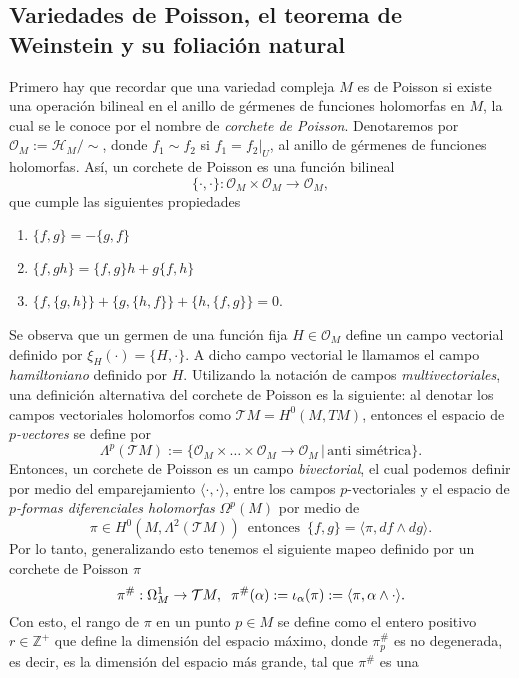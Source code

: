 \documentclass{article}
\newcommand{\zah}{\ensuremath{ \mathbb Z }}
\begin{document}
\subsection{Variedades de Poisson, el teorema de Weinstein y su foliaci\'on natural}
\noindent Primero hay que recordar que una variedad compleja $M$ es de Poisson si existe una operaci\'on bilineal en el anillo de g\'ermenes de 
funciones holomorfas en $M$, la cual se le conoce por el nombre de \emph{corchete de Poisson}. Denotaremos por $\mathcal{O}_M:=\mathcal{H}_M/\sim$, donde $f_1\sim f_2$ si 
$f_1=f_2|_U$, al anillo de g\'ermenes de funciones holomorfas. As\'i, un corchete de Poisson es una funci\'on bilineal
\[
\{\cdot,\cdot\}:\mathcal{O}_M\times\mathcal{O}_M\rightarrow\mathcal{O}_M,
\]
que cumple las siguientes propiedades
\begin{enumerate}
\item $\{f,g\} = -\{g,f\}$
\item $\{f,gh\}=\{f,g\}h + g\{f,h\}$
\item $\{f,\{g,h\}\}+\{g,\{h,f\}\} + \{h,\{ f,g\}\}=0$.
\end{enumerate}
\noindent Se observa que un germen de una funci\'on fija $H\in\mathcal{O}_M$ define un campo vectorial definido por $\xi_H(\cdot)=\{H,\cdot\}$.
A dicho campo vectorial le llamamos el campo \emph{hamiltoniano} definido por $H$. Utilizando la notaci\'on de campos \emph{multivectoriales}, 
una definici\'on alternativa del corchete de Poisson es la siguiente: al denotar los campos vectoriales holomorfos como $\mathcal{T}M=H^0(M,TM)$,
entonces el espacio de \emph{$p$-vectores} se define por 
\[
        \Lambda^{p}(\mathcal{T}M):=\{\mathcal{O}_M\times\dots\times\mathcal{O}_M\rightarrow\mathcal{O}_M\,\vert\,\text{anti sim\'etrica}\}.
\]
Entonces, un corchete de Poisson es un campo \emph{bivectorial}, el cual podemos definir por medio del emparejamiento $\langle\cdot,\cdot\rangle$,
entre los campos $p$-vectoriales y el espacio de \emph{$p$-formas diferenciales holomorfas} $\Omega^{p}(M)$ por medio de
\[
        \pi\in H^0(M,\Lambda^2(\mathcal{T}M))\,\text{ entonces }\,\{f,g\}=\langle \pi,df\wedge dg\rangle.
\]
Por lo tanto, generalizando esto tenemos el siguiente mapeo definido por un corchete de Poisson $\pi$
\[
        \pi^{\#}:\Omega^1_M\rightarrow\mathcal{T}M,\hspace{0.2cm}\pi^{\#}(\alpha):=\iota_{\alpha}(\pi):=\langle\pi,\alpha\wedge\cdot\rangle.
\]
\noindent Con esto, el rango de $\pi$ en un punto $p\in M$ se define como el entero positivo $r\in \zah^{+}$ que define la dimensi\'on del
espacio m\'aximo, donde $\pi^{\#}_p$ es no degenerada, es decir, es la dimensi\'on del espacio m\'as grande, tal que $\pi^{\#}$ es una
\end{document}
